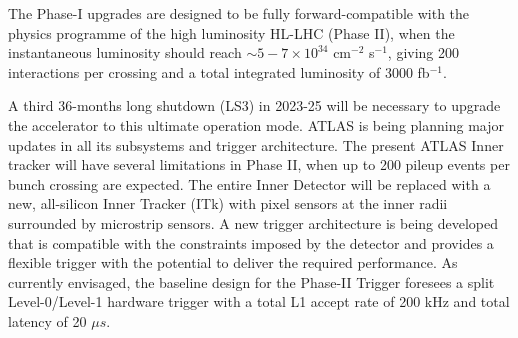 \ei
\noindent The  Phase-I  upgrades  are  designed  to  be  fully  forward-compatible  with  the  physics  programme  of  the  high luminosity HL-LHC (Phase II), when the instantaneous luminosity should reach $\sim 5-7 \times 10^{34}$ cm$^{-2}$ s$^{-1}$, giving 200 interactions per crossing and a total integrated luminosity of 3000 fb$^{-1}$.\par
A third 36-months long shutdown (LS3) in 2023-25 will be necessary to upgrade the accelerator to this ultimate operation mode. ATLAS is being planning major updates in all its subsystems and trigger architecture. The present ATLAS Inner tracker will have several limitations in Phase II, when up to 200 pileup events per bunch crossing are expected.  The entire Inner Detector will be replaced with a new, all-silicon Inner Tracker (ITk) \cite{ITK} with pixel sensors at the inner radii surrounded by microstrip sensors.  A new trigger architecture is being developed that is compatible with the constraints imposed by the detector and provides a  flexible trigger with the potential to deliver the required performance. As currently envisaged, the baseline design for the Phase-II Trigger foresees a split Level-0/Level-1 hardware trigger with a total L1 accept rate of 200 kHz and total latency of 20 $\mu s$.





